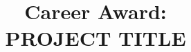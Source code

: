 \documentclass{style/nsf}
\begin{document}

\title{Career Award: \\ PROJECT TITLE}



\newpage{}


\newpage{}
\renewcommand\refname{References Cited}


\newpage{}


\newpage{}


\newpage{}


\newpage{}


\newpage{}

\newpage{}


\newpage{}

\end{document}
